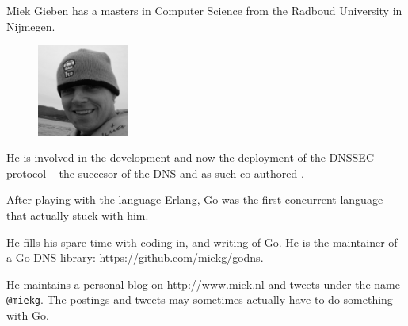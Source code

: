Miek Gieben has a masters in Computer Science from the Radboud University in Nijmegen.
\begin{figure}
  \begin{center}
  \includegraphics[width=3cm]{fig/avatar-miekg-300x300}
  \end{center}
\end{figure}
He is involved in the development and now the deployment of the DNSSEC protocol --
the succesor of the DNS and as such co-authored \cite{RFC4641}.

After playing with the language Erlang, Go was the first concurrent language
that actually stuck with him.

He fills his spare time with coding in, and writing of Go. He is the maintainer
of a Go DNS library: \url{https://github.com/miekg/godns}.

He maintains a personal blog on \url{http://www.miek.nl} and tweets
under the name \texttt{@miekg}. The postings and tweets may sometimes 
actually have to do something with Go.
